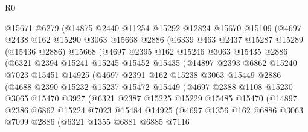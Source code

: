 \begin{lexlean}{R0}
\begin{coremodule}
          @15671
          @6279
          (@14875
            @2440
            @11254
            @15292
            @12824
            @15670
            @15109
            (@4697
              @2438
              @162
              @15290
              @3063
              @15668
              @2886
              (@6339
                @463
                @2437
                @15287
                @15289
                (@15436 @2886)
                @15668
                (@4697
                  @2395
                  @162
                  @15246
                  @3063
                  @15435
                  @2886
                  (@6321
                    @2394
                    @15241
                    @15245
                    @15452
                    @15435
                    (@14897
                      @2393
                      @6862
                      @15240
                      @7023
                      @15451
                      @14925
                      (@4697
                        @2391
                        @162
                        @15238
                        @3063
                        @15449
                        @2886
                        (@4688
                          @2390
                          @15232
                          @15237
                          @15472
                          @15449
                          (@4697
                            @2388
                            @1108
                            @15230
                            @3065
                            @15470
                            @3927
                            (@6321
                              @2387
                              @15225
                              @15229
                              @15485
                              @15470
                              (@14897
                                @2386
                                @6862
                                @15224
                                @7023
                                @15484
                                @14925
                                (@4697
                                  @1356
                                  @162
                                  @6886
                                  @3063
                                  @7099
                                  @2886
                                  (@6321
                                    @1355
                                    @6881
                                    @6885
                                    @7116

\end{coremodule}
\end{lexlean}
